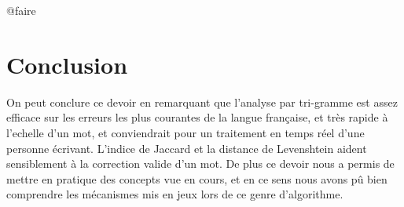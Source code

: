 \documentclass[french,12pt,a4]{report}
\begin{document}
@faire



\chapter{Conclusion}

On peut conclure ce devoir en remarquant que l'analyse par tri-gramme
est assez efficace sur les erreurs les plus courantes de la langue
française, et très rapide à l'echelle d'un mot, et conviendrait pour
un traitement en temps réel d'une personne écrivant. L'indice de Jaccard et la distance de
Levenshtein aident sensiblement à la correction valide d'un mot. De
plus ce devoir nous a permis de mettre en pratique des concepts vue en
cours, et en ce sens nous avons pû bien comprendre les mécanismes mis
en jeux lors de ce genre d'algorithme.
\end{document}
